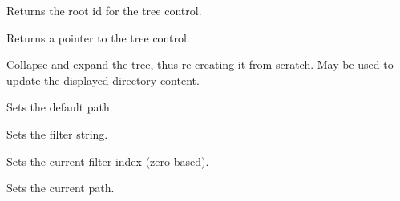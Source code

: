 
Returns the root id for the tree control.

\label{wxgenericdirctrlgettreectrl}


Returns a pointer to the tree control.

\label{wxgenericdirctrlrecreatetree}


Collapse and expand the tree, thus re-creating it from scratch.
May be used to update the displayed directory content.

\label{wxgenericdirctrlsetdefaultpath}


Sets the default path.

\label{wxgenericdirctrlsetfilter}


Sets the filter string.

\label{wxgenericdirctrlsetfilterindex}


Sets the current filter index (zero-based).

\label{wxgenericdirctrlsetpath}


Sets the current path.

